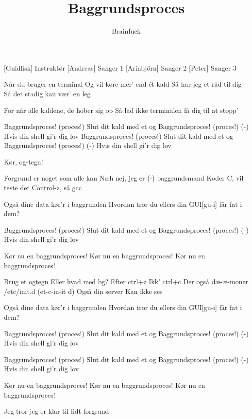\documentclass[a4paper,11pt]{article}
\title{Baggrundsproces}
\author{Brainfuck}
\begin{document}
\maketitle

\begin{roles}
 [Guldfisk] Instruktør
  [Andreas] Sanger 1
  [Arinbjörn] Sanger 2
  [Peter] Sanger 3
\end{roles}

\begin{song}
  Når du bruger en terminal
  Og vil køre mer’ end ét kald
  Så har jeg et råd til dig
  Så det stadig kan vær’ en leg

  For når alle kaldene, de hober sig op
  Så lad ikke terminalen få dig til at stopp’

  Baggrundsproces! (proces!)
  Slut dit kald med et og
  Baggrundsproces! (proces!)
  (-) Hvis din shell gi'r dig lov
  Baggrundsproces! (proces!)
  Slut dit kald med et og
  Baggrundsproces! (proces!)
  (-) Hvis din shell gi'r dig lov

  Kør, og-tegn!

  Forgrund er noget som alle kan
  Næh nej, jeg er (-) baggrundsmand
  Koder C, vil teste det
  Control-z, så gcc

  Også dine data kør'r i baggrunden
  Hvordan tror du ellers din GUI[gu-i] får fat i dem?

  Baggrundsproces! (proces!)
  Slut dit kald med et og
  Baggrundsproces! (proces!)
  (-) Hvis din shell gi'r dig lov

  Kør nu en baggrundsproces!
  Kør nu en baggrundsproces!
  Kør nu en baggrundsproces!

  Brug et ogtegn
  Eller hvad med bg?
  Efter ctrl+z
  Ikk’ ctrl+c
  Der også dæ-æ-moner
  /etc/init.d (et-c-in-it d)
  Også din server
  Kan ikke ses

  Også dine data kør'r i baggrunden
  Hvordan tror du ellers din GUI[gu-i] får fat i dem?

  Baggrundsproces! (proces!)
  Slut dit kald med et og
  Baggrundsproces! (proces!)
  (-) Hvis din shell gi'r dig lov

  Baggrundsproces! (proces!)
  Slut dit kald med et og
  Baggrundsproces! (proces!)
  (-) Hvis din shell gi'r dig lov

  Kør nu en baggrundsproces!
  Kør nu en baggrundsproces!
  Kør nu en baggrundsproces!
\end{song}

\begin{sketch}
  Jeg tror jeg er klar til lidt forgrund
\end{sketch}
\end{document}
